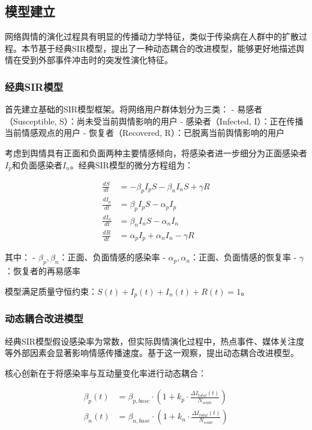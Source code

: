 \documentclass[withoutpreface,bwprint]{cumcmthesis}
\begin{document}
\subsection{模型建立}

网络舆情的演化过程具有明显的传播动力学特征，类似于传染病在人群中的扩散过程。本节基于经典SIR模型，提出了一种动态耦合的改进模型，能够更好地描述舆情在受到外部事件冲击时的突发性演化特征。

\subsubsection{经典SIR模型}

首先建立基础的SIR模型框架。将网络用户群体划分为三类：
- 易感者（Susceptible, S）：尚未受当前舆情影响的用户
- 感染者（Infected, I）：正在传播当前情感观点的用户  
- 恢复者（Recovered, R）：已脱离当前舆情影响的用户

考虑到舆情具有正面和负面两种主要情感倾向，将感染者进一步细分为正面感染者$I_p$和负面感染者$I_n$。经典SIR模型的微分方程组为：

\begin{equation}
\label{eq:sir_classic}
\begin{aligned}
\frac{dS}{dt} &= -\beta_p I_p S - \beta_n I_n S + \gamma R \\
\frac{dI_p}{dt} &= \beta_p I_p S - \alpha_p I_p \\
\frac{dI_n}{dt} &= \beta_n I_n S - \alpha_n I_n \\
\frac{dR}{dt} &= \alpha_p I_p + \alpha_n I_n - \gamma R
\end{aligned}
\end{equation}

其中：
- $\beta_p, \beta_n$：正面、负面情感的感染率
- $\alpha_p, \alpha_n$：正面、负面情感的恢复率
- $\gamma$：恢复者的再易感率

模型满足质量守恒约束：$S(t) + I_p(t) + I_n(t) + R(t) = 1$。

\subsubsection{动态耦合改进模型}

经典SIR模型假设感染率为常数，但实际舆情演化过程中，热点事件、媒体关注度等外部因素会显著影响情感传播速度。基于这一观察，提出动态耦合改进模型。

核心创新在于将感染率与互动量变化率进行动态耦合：

\begin{equation}
\label{eq:dynamic_infection_rate}
\begin{aligned}
\beta_p(t) &= \beta_{p,base} \cdot \left(1 + k_p \cdot \frac{\Delta I_{total}(t)}{N_{scale}}\right) \\
\beta_n(t) &= \beta_{n,base} \cdot \left(1 + k_n \cdot \frac{\Delta I_{total}(t)}{N_{scale}}\right)
\end{aligned}
\end{equation}
\end{document}
